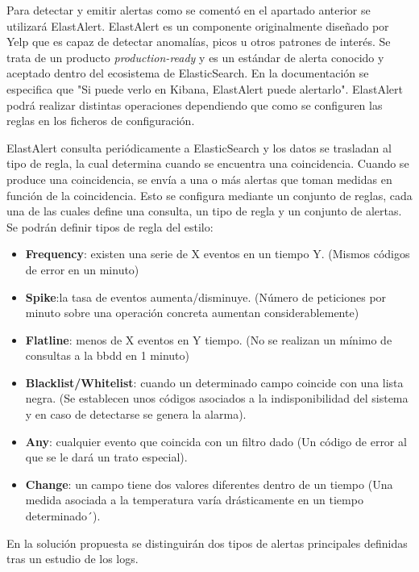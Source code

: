 Para detectar y emitir alertas como se comentó en el apartado anterior se utilizará ElastAlert.
ElastAlert es un componente originalmente diseñado por Yelp que es capaz de detectar anomalías, picos u otros patrones de interés. Se trata de un producto \textit{production-ready} y es un estándar de alerta conocido y aceptado dentro del ecosistema de ElasticSearch. En la documentación se especifica que "Si puede verlo en Kibana, ElastAlert puede alertarlo". ElastAlert podrá realizar distintas operaciones dependiendo que como se configuren las reglas en los ficheros de configuración. 

ElastAlert consulta periódicamente a ElasticSearch y los datos se trasladan al tipo de regla, la cual determina cuando se encuentra una coincidencia. Cuando se produce una coincidencia, se envía a una o más alertas que toman medidas en función de la coincidencia. Esto se configura mediante un conjunto de reglas, cada una de las cuales define una consulta, un tipo de regla y un conjunto de alertas. Se podrán definir tipos de regla del estilo:

\begin{itemize}
\item \textbf{Frequency}: existen una serie de X eventos en un tiempo Y. (Mismos códigos de error en un minuto)
\item \textbf{Spike}:la tasa de eventos aumenta/disminuye. (Número de peticiones por minuto sobre una operación concreta aumentan considerablemente) 
\item \textbf{Flatline}: menos de X eventos en Y tiempo. (No se realizan un mínimo de consultas a la bbdd en 1 minuto)
\item \textbf{Blacklist/Whitelist}: cuando un determinado campo coincide con una lista negra. (Se establecen unos códigos asociados a la indisponibilidad del sistema y en caso de detectarse se genera la alarma).
\item \textbf{Any}: cualquier evento que coincida con un filtro dado (Un código de error al que se le dará un trato especial).
\item \textbf{Change}: un campo tiene dos valores diferentes dentro de un tiempo (Una medida asociada a la temperatura varía drásticamente en un tiempo determinado´).

\end{itemize}

En la solución propuesta se distinguirán dos tipos de alertas principales definidas tras un estudio de los logs.

